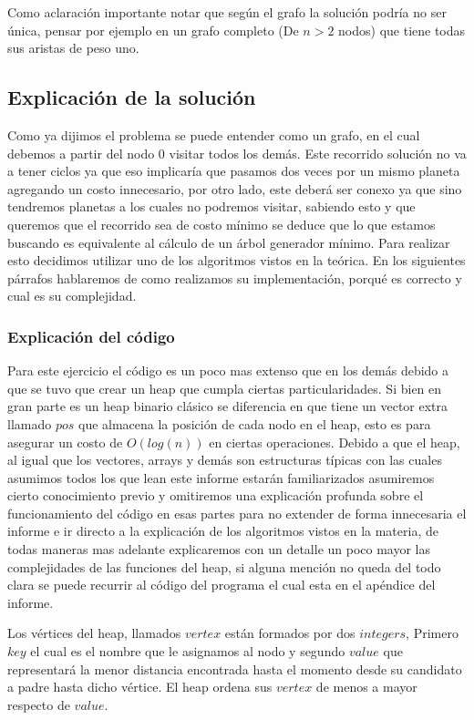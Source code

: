 Como aclaración importante notar que según el grafo la solución podría no ser única, pensar por ejemplo en un grafo completo (De $n > 2$ nodos) que tiene todas sus aristas de peso uno.

\subsection{Explicación de la solución}

Como ya dijimos el problema se puede entender como un grafo, en el cual debemos a partir del nodo 0 visitar todos los demás. Este recorrido solución no va a tener ciclos ya que eso implicaría que pasamos dos veces por un mismo planeta agregando un costo innecesario, por otro lado, este deberá ser conexo ya que sino tendremos planetas a los cuales no podremos visitar, sabiendo esto y que queremos que el recorrido sea de costo mínimo se deduce que lo que estamos buscando es equivalente al cálculo de un árbol generador mínimo. Para realizar esto decidimos utilizar uno de los algoritmos vistos en la teórica. En los siguientes párrafos hablaremos de como realizamos su implementación, porqué es correcto y cual es su complejidad.

\subsubsection{Explicación del código}

Para este ejercicio el código es un poco mas extenso que en los demás debido a que se tuvo que crear un heap que cumpla ciertas particularidades. Si bien en gran parte es un heap binario clásico se diferencia en que tiene un vector extra llamado $pos$ que almacena la posición de cada nodo en el heap, esto es para asegurar un costo de $O(log(n))$ en ciertas operaciones. Debido a que el heap, al igual que los vectores, arrays y demás son estructuras típicas con las cuales asumimos todos los que lean este informe estarán familiarizados asumiremos cierto conocimiento previo y omitiremos una explicación profunda sobre el funcionamiento del código en esas partes para no extender de forma innecesaria el informe e ir directo a la explicación de los algoritmos vistos en la materia, de todas maneras mas adelante explicaremos con un detalle un poco mayor las complejidades de las funciones del heap, si alguna mención no queda del todo clara se puede recurrir al código del programa el cual esta en el apéndice del informe.

Los v\'ertices del heap, llamados $vertex$ están formados por dos $integers$, Primero $key$ el cual es el nombre que le asignamos al nodo y segundo $value$ que representará la menor distancia encontrada hasta el momento desde su candidato a padre hasta dicho vértice. El heap ordena sus $vertex$ de menos a mayor respecto de $value$.

